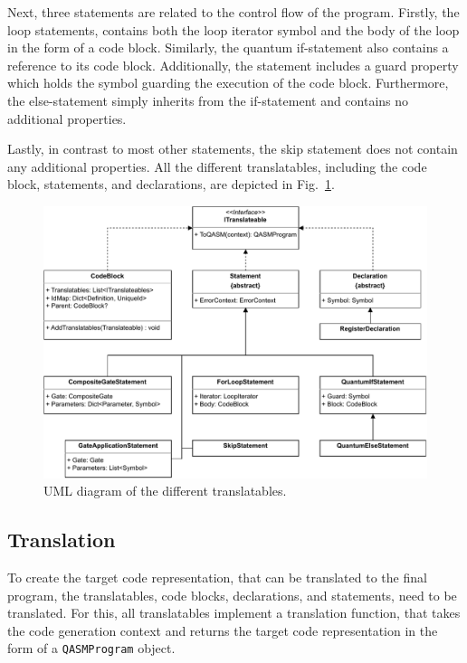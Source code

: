 Next, three statements are related to the control flow of the program. Firstly, the loop statements, contains both the loop iterator symbol and the body of the loop in the form of a code block. Similarly, the quantum if-statement also contains a reference to its code block. Additionally, the statement includes a guard property which holds the symbol guarding the execution of the code block. Furthermore, the else-statement simply inherits from the if-statement and contains no additional properties.

Lastly, in contrast to most other statements, the skip statement does not contain any additional properties. All the different translatables, including the code block, statements, and declarations, are depicted in Fig.~\ref{fig:implementation_uml_translatables}. 

\begin{figure}[htp]
    \centering
    \includegraphics[width=.9\textwidth]{../figures/drawio/uml_translateables.pdf}
    \caption{UML diagram of the different translatables.}
    \label{fig:implementation_uml_translatables}
\end{figure}

\subsection{Translation}
\label{sec:implementation_translation}
To create the target code representation, that can be translated to the final program, the translatables, \ie code blocks, declarations, and statements, need to be translated. For this, all translatables implement a translation function, that takes the code generation context and returns the target code representation in the form of a \texttt{QASMProgram} object.

